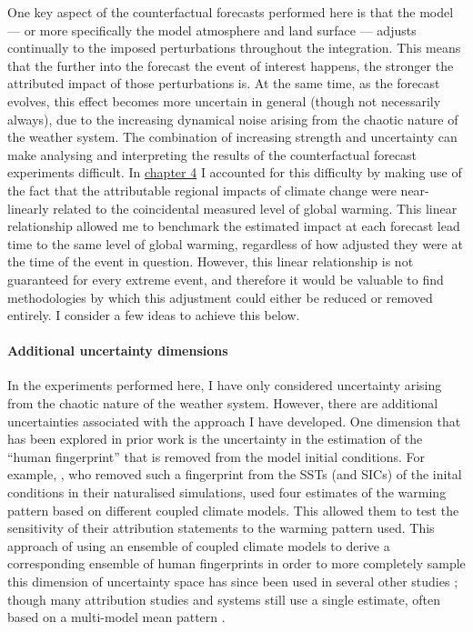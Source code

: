    One key aspect of the counterfactual forecasts performed here is that the model --- or more specifically the model atmosphere and land surface --- adjusts continually to the imposed perturbations throughout the integration. This means that the further into the forecast the event of interest happens, the stronger the attributed impact of those perturbations is. At the same time, as the forecast evolves, this effect becomes more uncertain in general (though not necessarily always), due to the increasing dynamical noise arising from the chaotic nature of the weather system. The combination of increasing strength and uncertainty can make analysing and interpreting the results of the counterfactual forecast experiments difficult. In \hyperref[ch4]{chapter 4} I accounted for this difficulty by making use of the fact that the attributable regional impacts of climate change were near-linearly related to the coincidental measured level of global warming. This linear relationship allowed me to benchmark the estimated impact at each forecast lead time to the same level of global warming, regardless of how adjusted they were at the time of the event in question. However, this linear relationship is not guaranteed for every extreme event, and therefore it would be valuable to find methodologies by which this adjustment could either be reduced or removed entirely. I consider a few ideas to achieve this below.

  \paragraph*{Additional uncertainty dimensions}

    In the experiments performed here, I have only considered uncertainty arising from the chaotic nature of the weather system. However, there are additional uncertainties associated with the approach I have developed. One dimension that has been explored in prior work is the uncertainty in the estimation of the ``human fingerprint'' that is removed from the model initial conditions. For example, \citet{pall_anthropogenic_2011}, who removed such a fingerprint from the SSTs (and SICs) of the inital conditions in their naturalised simulations, used four estimates of the warming pattern based on different coupled climate models. This allowed them to test the sensitivity of their attribution statements to the warming pattern used. This approach of using an ensemble of coupled climate models to derive a corresponding ensemble of human fingerprints in order to more completely sample this dimension of uncertainty space has since been used in several other studies \citep{schaller_human_2016}; though many attribution studies and systems still use a single estimate, often based on a multi-model mean pattern \citep{ciavarella_upgrade_2018,stone_benchmark_2021}. 

